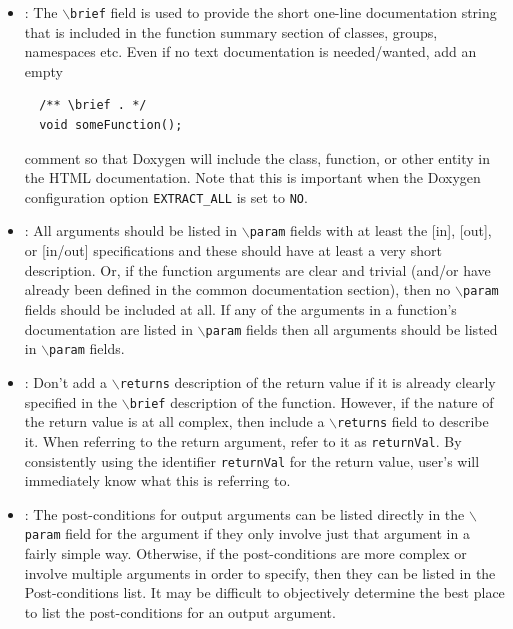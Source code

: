 \begin{itemize}
{}\item\DOXAddBrief: The {}\texttt{$\backslash$brief} field is used to provide
the short one-line documentation string that is included in the function
summary section of classes, groups, namespaces etc.  Even if no text
documentation is needed/wanted, add an empty
%
{\small\begin{verbatim}
  /** \brief . */
  void someFunction();
\end{verbatim}}
%
comment so that Doxygen will include the class, function, or other entity in
the HTML documentation.  Note that this is important when the Doxygen
configuration option {}\texttt{EXTRACT\-\_ALL} is set to {}\texttt{NO}.

{}\item\DOXAllOrNoneParam: All arguments should be listed in
{}\texttt{$\backslash$param} fields with at least the [in], [out], or [in/out]
specifications and these should have at least a very short description.  Or,
if the function arguments are clear and trivial (and/or have already been
defined in the common documentation section), then no
{}\texttt{$\backslash$param} fields should be included at all.  If any of the
arguments in a function's documentation are listed in
{}\texttt{$\backslash$param} fields then all arguments should be listed in
{}\texttt{$\backslash$param} fields.

{}\item\DOXReturnsOnlyIfNeeded: Don't add a {}\texttt{$\backslash$returns}
description of the return value if it is already clearly specified in the
{}\texttt{$\backslash$brief} description of the function.  However, if the
nature of the return value is at all complex, then include a
{}\texttt{$\backslash$returns} field to describe it.  When referring to the
return argument, refer to it as {}\texttt{returnVal}.  By consistently using
the identifier {}\texttt{returnVal} for the return value, user's will
immediately know what this is referring to.

{}\item\DOXPreferPostconditionsInParam: The post-conditions for output
arguments can be listed directly in the {}\texttt{$\backslash$param} field for
the argument if they only involve just that argument in a fairly simple way.
Otherwise, if the post-conditions are more complex or involve multiple
arguments in order to specify, then they can be listed in the Post-conditions
list.  It may be difficult to objectively determine the best place to list the
post-conditions for an output argument.


\end{itemize}
